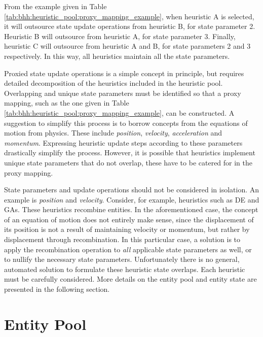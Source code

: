From the example given in Table \ref{tab:bhh:heuristic_pool:proxy_mapping_example}, when heuristic A is selected, it will outsource state update operations from heuristic B, for state parameter 2. Heuristic B will outsource from heuristic A, for state parameter 3. Finally, heuristic C will outsource from heuristic A and B, for state parameters 2 and 3 respectively. In this way, all heuristics maintain all the state parameters.

Proxied state update operations is a simple concept in principle, but requires detailed decomposition of the heuristics included in the heuristic pool.  Overlapping and unique state parameters must be identified so that a proxy mapping, such as the one given in Table \ref{tab:bhh:heuristic_pool:proxy_mapping_example}, can be constructed. A suggestion to simplify this process is to borrow concepts from the equations of motion from physics. These include \textit{position}, \textit{velocity}, \textit{acceleration} and \textit{momentum}. Expressing heuristic update steps according to these parameters drastically simplify the process. However, it is possible that heuristics implement unique state parameters that do not overlap, these have to be catered for in the proxy mapping.

State parameters and update operations should not be considered in isolation. An example is \textit{position} and \textit{velocity}. Consider, for example, heuristics such as \acf{DE} and \acfp{GA}. These heuristics recombine entities. In the aforementioned case, the concept of an equation of motion does not entirely make sense, since the displacement of its position is not a result of maintaining velocity or momentum, but rather by displacement through recombination. In this particular case, a solution is to apply the recombination operation to \textit{all} applicable state parameters as well, or to nullify the necessary state parameters. Unfortunately there is no general, automated solution to formulate these heuristic state overlaps. Each heuristic must be carefully considered. More details on the entity pool and entity state are presented in the following section.

\section{Entity Pool}\label{sec:bhh:entity_pool}

